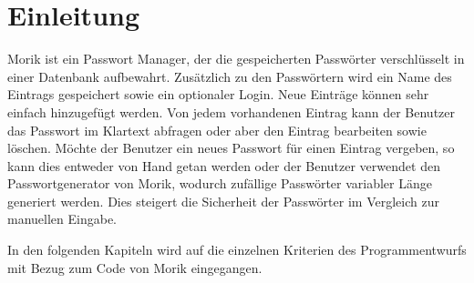 \chapter{Einleitung}
Morik ist ein Passwort Manager, der die gespeicherten Passwörter verschlüsselt in einer Datenbank aufbewahrt. Zusätzlich zu den Passwörtern wird ein Name des Eintrags gespeichert sowie ein optionaler Login. Neue Einträge können sehr einfach hinzugefügt werden. Von jedem vorhandenen Eintrag kann der Benutzer das Passwort im Klartext abfragen oder aber den Eintrag bearbeiten sowie löschen. Möchte der Benutzer ein neues Passwort für einen Eintrag vergeben, so kann dies entweder von Hand getan werden oder der Benutzer verwendet den Passwortgenerator von Morik, wodurch zufällige Passwörter variabler Länge generiert werden. Dies steigert die Sicherheit der Passwörter im Vergleich zur manuellen Eingabe.

In den folgenden Kapiteln wird auf die einzelnen Kriterien des Programmentwurfs mit Bezug zum Code von Morik eingegangen.
